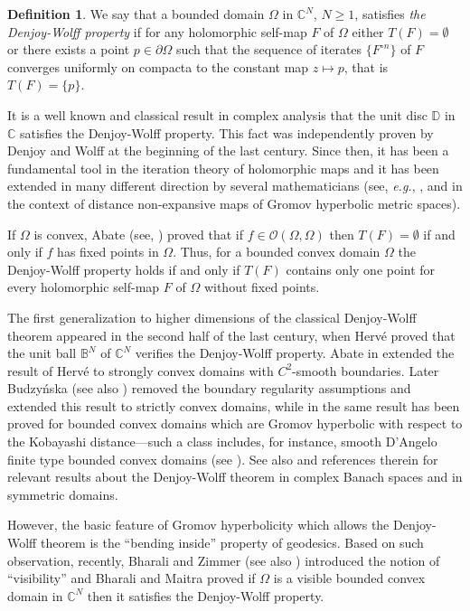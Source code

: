 \documentclass[12pt]{amsart}
\theoremstyle{definition}
\newtheorem{definition}[theorem]{Definition}
\theoremstyle{remark}
\numberwithin{equation}{section}
\def\C{\mathbb C}
\def\D{\mathbb D}
\begin{document}
\begin{definition}\label{def:wolffdenjoyproperty}
We say that a bounded domain $\Omega$ in $\C^N$, $N\geq 1$, satisfies \emph{the Denjoy-Wolff property} if for any holomorphic self-map $F$ of $\Omega$ either $T(F)=\emptyset$ or  there exists a point $p\in\partial\Omega$ such that the sequence of iterates $\{F^{\circ n}\}$ of $F$ converges uniformly on compacta to the constant map $z\mapsto p$, that is $T(F)=\{p\}$. 
\end{definition}

It is a well known and classical result in complex analysis that the unit disc $\D$ in $\mathbb{C}$ satisfies the Denjoy-Wolff property. This fact was independently proven by Denjoy and Wolff \cite{Den, Wol1,Wol2} at the beginning of the last century. Since then, it has been a fundamental tool in the iteration theory of holomorphic maps and it has been extended in many different direction by several mathematicians (see, {\sl e.g.}, \cite{AbateTaut}, and \cite{Kar}  in the context of  distance non-expansive maps of Gromov hyperbolic metric spaces).  

If $\Omega$ is convex, Abate (see, \cite[Theorem~2.4.20]{AbateTaut}) proved that if $f\in \mathcal{O}(\Omega,\Omega)$ then   $T(F)=\emptyset$ if and only if $f$ has fixed points in $\Omega$. Thus, for a bounded convex domain $\Omega$  the Denjoy-Wolff property holds if and only if $T(F)$ contains only one point for every holomorphic self-map $F$ of $\Omega$ without fixed points.


The first generalization to higher dimensions of the classical Denjoy-Wolff theorem appeared in the second half of the last century, when Herv\'e \cite{Her2} proved that the unit ball $\mathbb B^N$ of $\mathbb C^N$ verifies the Denjoy-Wolff property. Abate in \cite{Aba, AbateTaut} extended the result of Herv\'e to strongly convex domains with $C^2$-smooth boundaries. Later Budzy\'nska \cite{Bud} (see also \cite{AR}) removed the boundary regularity assumptions and extended this result to strictly convex domains, while in \cite{BGZ} the same result has been proved for bounded convex domains which are Gromov hyperbolic with respect to the Kobayashi distance---such a class includes, for instance, smooth D'Angelo finite type bounded convex domains (see \cite{Zi1, Zi2}). See also \cite{BKR, CR} and references therein for relevant results about the Denjoy-Wolff theorem in complex Banach spaces and in  symmetric domains.

However, the basic feature of Gromov hyperbolicity which allows the Denjoy-Wolff theorem is the ``bending inside'' property of geodesics. Based on such observation, recently, Bharali and Zimmer \cite{BZ} (see also \cite{BNT}) introduced the notion of ``visibility'' and Bharali and Maitra \cite[Theorem 1.8]{BM} proved if $\Omega$ is a visible bounded convex domain in $\C^N$ then it satisfies the Denjoy-Wolff property. 
\end{document}
